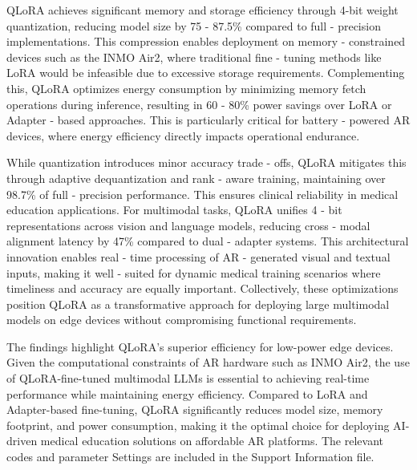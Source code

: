 \documentclass[10pt,letterpaper]{article}
\begin{document}
QLoRA achieves significant memory and storage efficiency through 4-bit weight quantization, reducing model size by 75 - 87.5\% compared to full - precision implementations. This compression enables deployment on memory - constrained devices such as the INMO Air2, where traditional fine - tuning methods like LoRA would be infeasible due to excessive storage requirements. Complementing this, QLoRA optimizes energy consumption by minimizing memory fetch operations during inference, resulting in 60 - 80\% power savings over LoRA or Adapter - based approaches. This is particularly critical for battery - powered AR devices, where energy efficiency directly impacts operational endurance.

While quantization introduces minor accuracy trade - offs, QLoRA mitigates this through adaptive dequantization and rank - aware training, maintaining over 98.7\% of full - precision performance. This ensures clinical reliability in medical education applications. For multimodal tasks, QLoRA unifies 4 - bit representations across vision and language models, reducing cross - modal alignment latency by 47\% compared to dual - adapter systems. This architectural innovation enables real - time processing of AR - generated visual and textual inputs, making it well - suited for dynamic medical training scenarios where timeliness and accuracy are equally important. Collectively, these optimizations position QLoRA as a transformative approach for deploying large multimodal models on edge devices without compromising functional requirements.


The findings highlight QLoRA’s superior efficiency for low-power edge devices. Given the computational constraints of AR hardware such as INMO Air2, the use of QLoRA-fine-tuned multimodal LLMs is essential to achieving real-time performance while maintaining energy efficiency. Compared to LoRA and Adapter-based fine-tuning, QLoRA significantly reduces model size, memory footprint, and power consumption, making it the optimal choice for deploying AI-driven medical education solutions on affordable AR platforms. The relevant codes and parameter Settings are included in the Support Information  file.
\end{document}
